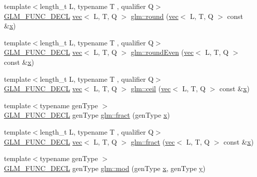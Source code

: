 \begin{DoxyCompactItemize}
\item 
{\footnotesize template$<$length\+\_\+t L, typename T , qualifier Q$>$ }\\\hyperlink{setup_8hpp_ab2d052de21a70539923e9bcbf6e83a51}{G\+L\+M\+\_\+\+F\+U\+N\+C\+\_\+\+D\+E\+CL} \hyperlink{structglm_1_1vec}{vec}$<$ L, T, Q $>$ \hyperlink{group__core__func__common_gafa03aca8c4713e1cc892aa92ca135a7e}{glm\+::round} (\hyperlink{structglm_1_1vec}{vec}$<$ L, T, Q $>$ const \&\hyperlink{_s_d_l__opengl_8h_ad0e63d0edcdbd3d79554076bf309fd47}{x})
\item 
{\footnotesize template$<$length\+\_\+t L, typename T , qualifier Q$>$ }\\\hyperlink{setup_8hpp_ab2d052de21a70539923e9bcbf6e83a51}{G\+L\+M\+\_\+\+F\+U\+N\+C\+\_\+\+D\+E\+CL} \hyperlink{structglm_1_1vec}{vec}$<$ L, T, Q $>$ \hyperlink{group__core__func__common_ga76b81785045a057989a84d99aeeb1578}{glm\+::round\+Even} (\hyperlink{structglm_1_1vec}{vec}$<$ L, T, Q $>$ const \&\hyperlink{_s_d_l__opengl_8h_ad0e63d0edcdbd3d79554076bf309fd47}{x})
\item 
{\footnotesize template$<$length\+\_\+t L, typename T , qualifier Q$>$ }\\\hyperlink{setup_8hpp_ab2d052de21a70539923e9bcbf6e83a51}{G\+L\+M\+\_\+\+F\+U\+N\+C\+\_\+\+D\+E\+CL} \hyperlink{structglm_1_1vec}{vec}$<$ L, T, Q $>$ \hyperlink{group__core__func__common_gafb9d2a645a23aca12d4d6de0104b7657}{glm\+::ceil} (\hyperlink{structglm_1_1vec}{vec}$<$ L, T, Q $>$ const \&\hyperlink{_s_d_l__opengl_8h_ad0e63d0edcdbd3d79554076bf309fd47}{x})
\item 
{\footnotesize template$<$typename gen\+Type $>$ }\\\hyperlink{setup_8hpp_ab2d052de21a70539923e9bcbf6e83a51}{G\+L\+M\+\_\+\+F\+U\+N\+C\+\_\+\+D\+E\+CL} gen\+Type \hyperlink{group__core__func__common_ga8ba89e40e55ae5cdf228548f9b7639c7}{glm\+::fract} (gen\+Type \hyperlink{_s_d_l__opengl_8h_ad0e63d0edcdbd3d79554076bf309fd47}{x})
\item 
{\footnotesize template$<$length\+\_\+t L, typename T , qualifier Q$>$ }\\\hyperlink{setup_8hpp_ab2d052de21a70539923e9bcbf6e83a51}{G\+L\+M\+\_\+\+F\+U\+N\+C\+\_\+\+D\+E\+CL} \hyperlink{structglm_1_1vec}{vec}$<$ L, T, Q $>$ \hyperlink{group__core__func__common_ga2df623004f634b440d61e018d62c751b}{glm\+::fract} (\hyperlink{structglm_1_1vec}{vec}$<$ L, T, Q $>$ const \&\hyperlink{_s_d_l__opengl_8h_ad0e63d0edcdbd3d79554076bf309fd47}{x})
\item 
{\footnotesize template$<$typename gen\+Type $>$ }\\\hyperlink{setup_8hpp_ab2d052de21a70539923e9bcbf6e83a51}{G\+L\+M\+\_\+\+F\+U\+N\+C\+\_\+\+D\+E\+CL} gen\+Type \hyperlink{group__core__func__common_ga12201563ef902e3b07e0d1d7656efdb1}{glm\+::mod} (gen\+Type \hyperlink{_s_d_l__opengl_8h_ad0e63d0edcdbd3d79554076bf309fd47}{x}, gen\+Type \hyperlink{_s_d_l__opengl_8h_a1675d9d7bb68e1657ff028643b4037e3}{y})

\end{DoxyCompactItemize}
